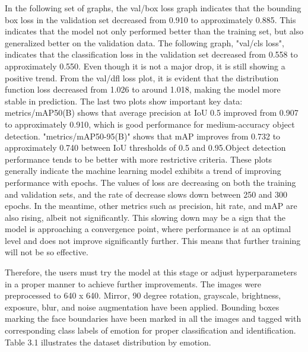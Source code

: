\documentclass[a4paper,13pt]{report}
\begin{document}
In the following set of graphs, the val/box loss graph indicates that the bounding box loss in the validation set decreased from 0.910 to approximately 0.885. This indicates that the model not only performed better than the training set, but also generalized better on the validation data. The following graph, "val/cls loss", indicates that the classification loss in the validation set decreased from 0.558 to approximately 0.550. Even though it is not a major drop, it is still showing a positive trend. From the val/dfl loss plot, it is evident that the distribution function loss decreased from 1.026 to around 1.018, making the model more stable in prediction. The last two plots show important key data:
metrics/mAP50(B) shows that average precision at IoU 0.5 improved from 0.907 to approximately 0.910, which is good performance for medium-accuracy object detection. "metrics/mAP50-95(B)" shows that mAP improves from 0.732 to approximately 0.740 between IoU thresholds of 0.5 and 0.95.Object detection performance tends to be better with more restrictive criteria. These plots generally indicate the machine learning model exhibits a trend of improving performance with epochs. The values of loss are decreasing on both the training and validation sets, and the rate of decrease slows down between 250 and 300 epochs. In the meantime, other metrics such as precision, hit rate, and mAP are also rising, albeit not significantly. This slowing down may be a sign that the model is approaching a convergence point, where performance is at an optimal level and does not improve significantly further. This means that further training will not be so effective.

Therefore, the users must try the model at this stage or adjust hyperparameters in a proper manner to achieve further improvements.
The images were preprocessed to 640 x 640. Mirror, 90 degree rotation, grayscale, brightness, exposure, blur, and noise augmentation have been applied. Bounding boxes marking the face boundaries have been marked in all the images and tagged with corresponding class labels of emotion for proper classification and identification. Table 3.1 illustrates the dataset distribution by emotion.
\end{document}
